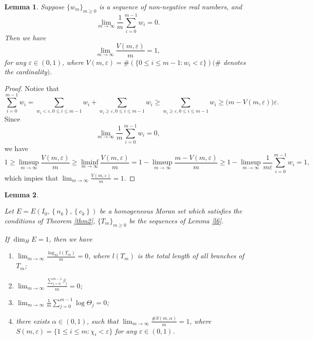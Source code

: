 \documentclass[reqno]{amsart}
\theoremstyle{plain}
\newtheorem{lem}{Lemma}
\theoremstyle{definition}
\theoremstyle{remark}
\numberwithin{equation}{section} \DeclareMathOperator\intr{int}
\begin{document}
\begin{lem}\label{l9}
Suppose $\{w_m\}_{m\ge 0}$ is a sequence of non-negative real numbers, and
\begin{equation*}
\lim_{m \to \infty} \frac{1}{m} \sum_{i=0}^{m-1} w_i=0.
\end{equation*}
Then we have
\begin{equation*}
\lim_{m \to \infty} \frac{V(m,\varepsilon )}{m} =1,
 \end{equation*}
for any $\varepsilon\in (0,1)$, where $V(m,\varepsilon )=\#(\{0\le i\le m-1: w_i<\varepsilon\})$$(\#$ denotes the cardinality$)$.
\end{lem}

\begin{proof}
Notice that \begin{equation}\label{111}
\sum_{i=0}^{m-1} w_i=\sum_{w_i<\varepsilon, 0\le i\le m-1}w_i+\sum_{w_i\ge \varepsilon, 0\le i\le m-1}w_i\ge \sum_{w_i\ge \varepsilon, 0\le i\le m-1}w_i \ge \big(m-V(m,\varepsilon ) \big)\varepsilon.\end{equation}
Since
\begin{equation*}
\lim_{m \to \infty} \frac{1}{m} \sum_{i=0}^{m-1} w_i=0,
\end{equation*}
we have
\begin{equation*}
1\ge\limsup\limits_{m \to \infty} \frac{V(m,\varepsilon )}{m}\ge\liminf\limits_{m \to \infty} \frac{V(m,\varepsilon )}{m} =1-\limsup\limits_{m \to \infty} \frac{m-V(m,\varepsilon )}{m}\ge1-\limsup\limits_{m \to \infty}\frac{1}{m\varepsilon }\sum_{i=0}^{m-1}w_i=1,
\end{equation*}
which impies that $\lim_{m \to \infty} \frac{V(m,\varepsilon )}{m} =1$.
\end{proof}


\begin{lem}\label{l10}

Let $E=E(I_{0},\left\{n_{k}\right\},\left\{c_{k}\right\})$ be a homogeneous Moran set which satisfies the conditions of Theorem {\rm\ref{thm2}}, $\{T_{m}\}_{m\ge 0}$ be the sequences of Lemma {\rm\ref{l6}}.


If $\dim_{H}E=1$, then we have
\begin{enumerate}
\item[\textup{(1)}]$\lim_{m\to \infty}\frac{\log_{M}l(T_{m}) }{m}=0$, where $l(T_{m})$ is the total length of all branches of $T_{m}$;
\item[\textup{(2)}]$\lim_{m\to \infty}\frac{\sum_{j=0}^{m-1}\beta_{j}}{m}=0$;
\item[\textup{(3)}]$\lim_{m \to \infty} \frac{1}{m} \sum_{j=0}^{m-1}\log\Theta_j=0$;
\item[\textup{(4)}]there exists $\alpha\in (0,1)$, such that $\lim_{m\to \infty}  \frac{\# S(m,\alpha )}{m}=1$, where $S(m,\varepsilon)=\{1\le i\le m:\chi_i<\varepsilon\}$ for any $\varepsilon\in (0,1)$.
\end{enumerate}

\end{lem}
\end{document}
